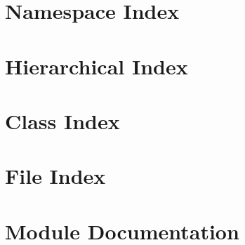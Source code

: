 \documentclass[twoside]{book}
\newcommand{\+}{\discretionary{\mbox{\scriptsize$\hookleftarrow$}}{}{}}
\begin{document}
\chapter{Namespace Index}

\chapter{Hierarchical Index}

\chapter{Class Index}

\chapter{File Index}

\chapter{Module Documentation}






































\end{document}
